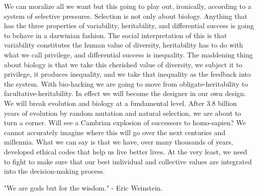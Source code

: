 We can moralize all we want but this going to play out, ironically, according to a system of selective pressures.
Selection is not only about biology.
Anything that has the three properties of variability, heritability, and differential success is going to behave in a darwinian fashion.
The social interpretation of this is that variability constitutes the human value of diversity, heritability has to do with what we call privilege, and differential success is inequality.
The maddening thing about biology is that we take this cherished value of diversity, we subject it to privilege, it produces inequality, and we take that inequality as the feedback into the system.
With bio-hacking we are going to move from obligate-heritability to facultative-heritability.
In effect we will become the designer in our own design.
We will break evolution and biology at a fundamental level.
After 3.8 billion years of evolution by random mutation and natural selection, we are about to turn a corner.
Will see a Cambrian explosion of successors to homo-sapien?
We cannot accurately imagine where this will go over the next centuries and millennia.
What we can say is that we have, over many thousands of years, developed ethical codes that help us live better lives.
At the very least, we need to fight to make sure that our best individual and collective values are integrated into the decision-making process.

"We are gods but for the wisdom." - Eric Weinstein.

